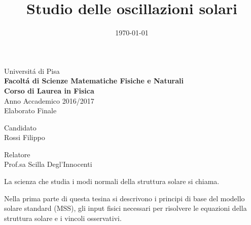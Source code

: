 \documentclass[twoside,11pt,fleqn]{memoir}%
\author{ }
\title{Studio delle oscillazioni solari}
\date{\today}
\makeatletter
\newcommand{\titolo}{\@title}
\makeatother
\begin{document}

\begingroup

\thispagestyle{empty}
\begin{center}
\Huge Universit\'a di Pisa\\ \vspace{1cm}\textbf{\huge Facolt\'a di Scienze Matematiche Fisiche e Naturali}\\ \vspace{2cm} \textbf{\LARGE Corso di Laurea in Fisica}\\\Large Anno Accademico 2016/2017\\ \vspace{5cm} \LARGE Elaborato Finale\\ \vspace{1cm} \Huge\titolo
\vspace{9cm}

{
\centering
\begin{minipage}[c]{0.5\textwidth}\centering\Large Candidato\\ \Large Rossi Filippo\end{minipage}\hfill \begin{minipage}[c]{0.5\textwidth}\centering\Large Relatore \\ \Large Prof.sa Scilla Degl'Innocenti\end{minipage}
}

\end{center}


\endgroup

\cleartorecto


\tableofcontents*

%


\mainmatter


\cleartorecto


La scienza che studia i modi normali della struttura solare si chiama.

Nella prima parte di questa tesina si descrivono i principi di base del modello solare standard (MSS), gli input fisici necessari per risolvere le equazioni della struttura solare e i vincoli osservativi.
\end{document}
